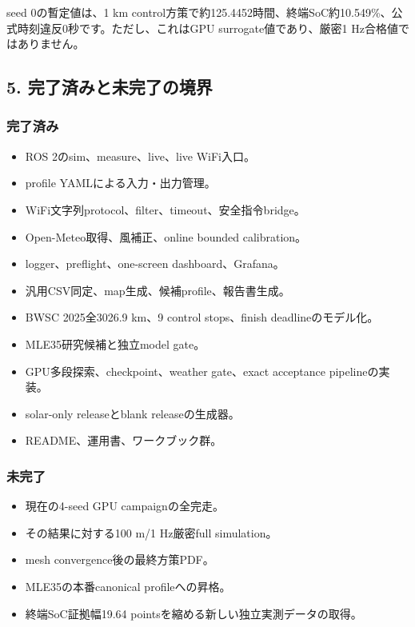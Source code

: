 \documentclass[
  japanese,
  a4paper,
  11pt]{article}
\providecommand{\tightlist}{%
  \setlength{\itemsep}{0pt}\setlength{\parskip}{0pt}}
\begin{document}
seed 0の暫定値は、1 km
control方策で約125.4452時間、終端SoC約10.549\%、公式時刻違反0秒です。ただし、これはGPU
surrogate値であり、厳密1 Hz合格値ではありません。

\subsection{5.
完了済みと未完了の境界}\label{5-ux5b8cux4e86ux6e08ux307fux3068ux672aux5b8cux4e86ux306eux5883ux754c}

\subsubsection{完了済み}\label{ux5b8cux4e86ux6e08ux307f}

\begin{itemize}
\tightlist
\item
  ROS 2のsim、measure、live、live WiFi入口。
\item
  profile YAMLによる入力・出力管理。
\item
  WiFi文字列protocol、filter、timeout、安全指令bridge。
\item
  Open-Meteo取得、風補正、online bounded calibration。
\item
  logger、preflight、one-screen dashboard、Grafana。
\item
  汎用CSV同定、map生成、候補profile、報告書生成。
\item
  BWSC 2025全3026.9 km、9 control stops、finish deadlineのモデル化。
\item
  MLE35研究候補と独立model gate。
\item
  GPU多段探索、checkpoint、weather gate、exact acceptance
  pipelineの実装。
\item
  solar-only releaseとblank releaseの生成器。
\item
  README、運用書、ワークブック群。
\end{itemize}

\subsubsection{未完了}\label{ux672aux5b8cux4e86}

\begin{itemize}
\tightlist
\item
  現在の4-seed GPU campaignの全完走。
\item
  その結果に対する100 m/1 Hz厳密full simulation。
\item
  mesh convergence後の最終方策PDF。
\item
  MLE35の本番canonical profileへの昇格。
\item
  終端SoC証拠幅19.64 pointsを縮める新しい独立実測データの取得。
\end{itemize}
\end{document}
